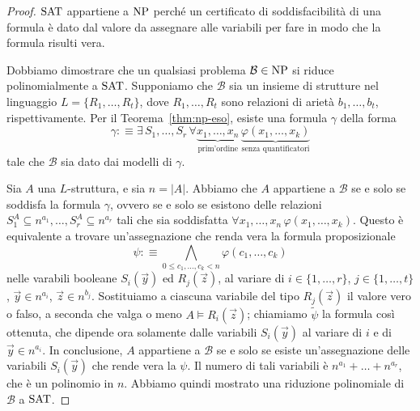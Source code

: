 \begin{proof}
  $\operatorname{SAT}$ appartiene a $\operatorname{NP}$ perché un certificato di soddisfacibilità di una formula è dato dal valore da assegnare alle variabili per fare in modo che la formula risulti vera.
  
  Dobbiamo dimostrare che un qualsiasi problema $\mathcal{B}\in\operatorname{NP}$ si riduce polinomialmente a $\operatorname{SAT}$.
  Supponiamo che $\mathcal{B}$ sia un insieme di strutture nel linguaggio $L=\{R_1,\dots,R_t\}$, dove $R_1,\dots,R_t$ sono relazioni di arietà $b_1,\dots,b_t$, rispettivamente.
  Per il Teorema~\ref{thm:np-eso}, esiste una formula $\gamma$ della forma
  \[ \gamma :\equiv \exists\, S_1,\dots,S_r \, \forall \underbrace{x_1,\dots,x_n}_{\text{prim'ordine}} \, \underbrace{\varphi(x_1,\dots,x_k)}_{\text{senza quantificatori}} \]
  tale che $\mathcal{B}$ sia dato dai modelli di $\gamma$.
  
  Sia $A$ una $L$-struttura, e sia $n=|A|$. Abbiamo che $A$ appartiene a $\mathcal{B}$ se e solo se soddisfa la formula $\gamma$, ovvero se e solo se esistono delle relazioni $S_1^A\subseteq n^{a_1}, \dots, S_r^A\subseteq n^{a_r}$ tali che sia soddisfatta $\forall x_1,\dots,x_n \,\varphi(x_1,\dots,x_k)$.
  Questo è equivalente a trovare un'assegnazione che renda vera la formula proposizionale
  \[ \psi :\equiv \bigwedge_{0\leq c_1,\dots,c_k < n} \varphi(c_1,\dots,c_k) \]
  nelle varabili booleane $S_i(\vec{y})$ ed $R_j(\vec{z})$, al variare di $i\in \{1,\ldots,r\}$, $j\in\{1,\dots,t\}$, $\vec{y}\in n^{a_i}$, $\vec{z}\in n^{b_j}$.
  Sostituiamo a ciascuna variabile del tipo $R_j(\vec{z})$ il valore vero o falso, a seconda che valga o meno $A \models R_i(\vec{z})$; chiamiamo $\tilde\psi$ la formula così ottenuta, che dipende ora solamente dalle variabili $S_i(\vec{y})$ al variare di $i$ e di $\vec{y}\in n^{a_i}$.
  In conclusione, $A$ appartiene a $\mathcal{B}$ se e solo se esiste un'assegnazione delle variabili $S_i(\vec{y})$ che rende vera la $\psi$. Il numero di tali variabili è $n^{a_1}+\ldots+n^{a_r}$, che è un polinomio in $n$.
  Abbiamo quindi mostrato una riduzione polinomiale di $\mathcal{B}$ a $\operatorname{SAT}$.
\end{proof}
